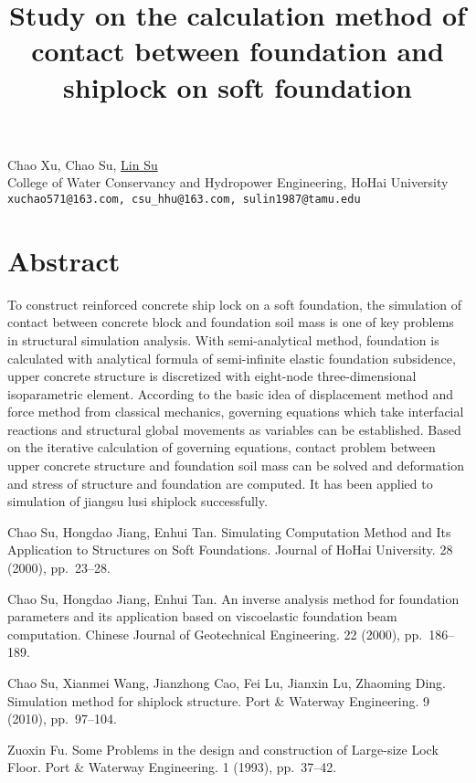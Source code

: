 \title{Study on the calculation method of contact between foundation and shiplock on soft foundation}
\author{} \institute{}
\maketitle

\begin{center}
{\large Chao Xu, Chao Su, \underline{Lin Su}}\\
College of Water Conservancy and Hydropower Engineering, HoHai University\\
{\tt xuchao571@163.com, csu\_hhu@163.com, sulin1987@tamu.edu}
\end{center}

\section*{Abstract}
To construct reinforced concrete ship lock on a soft foundation, the simulation of contact between concrete block and foundation soil mass is one of key problems in structural simulation analysis. With semi-analytical method, foundation is calculated with analytical formula of semi-infinite elastic foundation subsidence, upper concrete structure is discretized with eight-node three-dimensional isoparametric element. According to the basic idea of displacement method and force method from classical mechanics, governing equations which take interfacial reactions and structural global movements as variables can be established. Based on the iterative calculation of governing equations, contact problem between upper concrete structure and foundation soil mass can be solved and deformation and stress of structure and foundation are computed. It has been applied to simulation of jiangsu lusi shiplock successfully.


\begin{thebibliography}{10}
{\sc Chao Su, Hongdao Jiang, Enhui Tan}. {Simulating Computation Method and Its Application to Structures on Soft Foundations}. Journal of HoHai University. 28 (2000), pp.~23--28.

{\sc Chao Su, Hongdao Jiang, Enhui Tan}. {An inverse analysis method for foundation parameters and its application based on viscoelastic foundation beam computation}. Chinese Journal of Geotechnical Engineering. 22 (2000), pp.~186--189.

{\sc Chao Su, Xianmei Wang, Jianzhong Cao, Fei Lu, Jianxin Lu, Zhaoming Ding}. {Simulation method for shiplock structure}. Port \& Waterway Engineering. 9 (2010), pp.~97--104.

{\sc Zuoxin Fu}. {Some Problems in the design and construction of Large-size Lock Floor}. Port \& Waterway Engineering. 1 (1993), pp.~37--42.
\end{thebibliography}